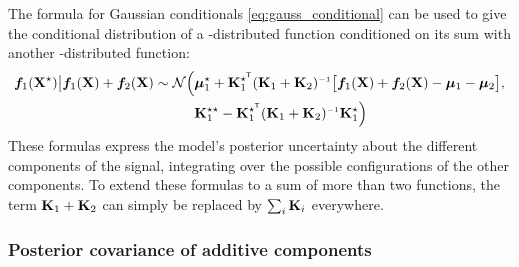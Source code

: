 The formula for Gaussian conditionals \ref{eq:gauss_conditional} can be used to give the conditional distribution of a \gp{}-distributed function conditioned on its sum with another \gp{}-distributed function:
%
\begin{align}
\vf_1(\vX^\star) \big| \vf_1(\vX) + \vf_2(\vX) \sim \Normal \Big( 
& \vmu_1^\star + \vK_1^{\star\tra} (\vK_1 + \vK_2)\inv \big[ \vf_1(\vX) + \vf_2(\vX) - \vmu_1 - \vmu_2 \big], \nonumber \\
& \vK_1^{\star\star} - \vK_1^{\star\tra} (\vK_1 + \vK_2)\inv \vK_1^{\star} \Big)
\end{align}
%
These formulas express the model's posterior uncertainty about the different components of the signal, integrating over the possible configurations of the other components.
To extend these formulas to a sum of more than two functions, the term $\mathbf{K}_1 + \mathbf{K}_2$ can simply be replaced by $\sum_i \mathbf{K}_i$ everywhere.




\subsubsection{Posterior covariance of additive components}

